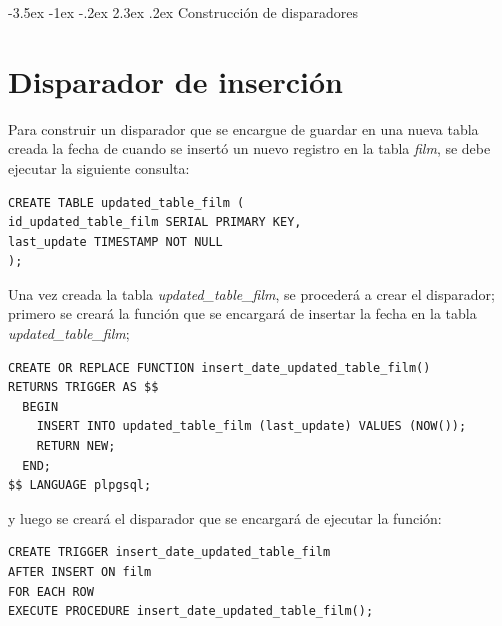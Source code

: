 \documentclass{report}
\makeatletter
\renewcommand\chapter{\@startsection{chapter}{0}{\z@}%
    {-3.5ex \@plus -1ex \@minus -.2ex}%
    {2.3ex \@plus.2ex}%
    {\normalfont\Large\bfseries}}
\makeatother
\begin{document}
\cleardoublepage

\chapter{Construcción de disparadores}
\section{Disparador de inserción}
Para construir un disparador que se encargue de guardar en una nueva tabla creada la fecha de cuando 
se insertó un nuevo registro en la tabla \emph{film}, se debe ejecutar la siguiente consulta:
\begin{verbatim}
CREATE TABLE updated_table_film (
id_updated_table_film SERIAL PRIMARY KEY,
last_update TIMESTAMP NOT NULL
);
\end{verbatim}

Una vez creada la tabla \emph{updated\_table\_film}, se procederá a crear el disparador; primero se creará la función
que se encargará de insertar la fecha en la tabla \emph{updated\_table\_film};

\begin{verbatim}
CREATE OR REPLACE FUNCTION insert_date_updated_table_film()
RETURNS TRIGGER AS $$
  BEGIN
    INSERT INTO updated_table_film (last_update) VALUES (NOW());
    RETURN NEW;
  END;
$$ LANGUAGE plpgsql;
\end{verbatim}

y luego se creará el disparador que se encargará de ejecutar la función:

\begin{verbatim}
CREATE TRIGGER insert_date_updated_table_film
AFTER INSERT ON film
FOR EACH ROW
EXECUTE PROCEDURE insert_date_updated_table_film();
\end{verbatim}
\end{document}
